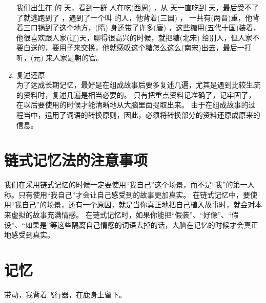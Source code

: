 \begin{enumerate}
  我们出生在 的 天，看到一群 人在吃(西周) ，从 天一直吃到 天，最后受不了了就逃跑到了 ，遇到了一个叫 的人，他背着(三国) ， 一共有(两晋)重，他背着三口锅到了这个地方，(隋) 身还带了许多(唐) ，这些糖用(五代十国)装着，他很喜欢跟人家(辽)天，聊得很高兴的时候，就把糖(北宋) 给别人，但人家不要白送的，要用子来交换，他就感叹这个糖怎么这么(南宋)出去，最后一打听，(元) 来人家是朝的官。
\item 复述还原\\
  为了达成长期记忆，最好是在组成故事后要多复述几遍，尤其是遇到比较生疏的资料时，复述几遍是相当必要的。
  只有把重点资料记准确了，记牢固了，在以后要使用的时候才能清晰地从大脑里面提取出来。
  由于在组成故事的过程当中，运用了词语的转换原则，因此，必须将转换部分的资料还原成原来的信息。
\end{enumerate}

\section{链式记忆法的注意事项}

我们在采用链式记忆的时候一定要使用“我自己”这个场景，而不是“我”的第一人称。只有使用“我自己”才会让自己感受到的故事更加真实。
在链式记忆中，要使用“我自己”的场景，还有一个原因，就是当你真正地把自己植入故事时，就会对本来虚拟的故事充满情感。
在链式记忆时，如果你能把“假装”、“好像”、“假设”、“如果是”等这些隔离自己情感的词语去掉的话，大脑在记忆的时候才会真正地感受到真实。


\section{记忆}

\begin{tcolorbox}
  带动，我背着飞行器，在鹿身上留下。
\end{tcolorbox}


